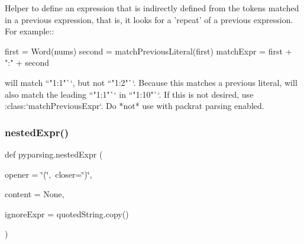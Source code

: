 \begin{DoxyVerb}Helper to define an expression that is indirectly defined from
the tokens matched in a previous expression, that is, it looks for
a 'repeat' of a previous expression.  For example::

    first = Word(nums)
    second = matchPreviousLiteral(first)
    matchExpr = first + ":" + second

will match ``"1:1"``, but not ``"1:2"``.  Because this
matches a previous literal, will also match the leading
``"1:1"`` in ``"1:10"``. If this is not desired, use
:class:`matchPreviousExpr`. Do *not* use with packrat parsing
enabled.
\end{DoxyVerb}
 \mbox{\label{namespacepyparsing_a9c52168a8f25a43675d7ee8d271332cb}} 
\subsubsection{\texorpdfstring{nested\+Expr()}{nestedExpr()}}
{\footnotesize\ttfamily def pyparsing.\+nested\+Expr (\begin{DoxyParamCaption}\item[{}]{opener = {\ttfamily \char`\"{}(\char`\"{},~closer=\char`\"{})\char`\"{}},  }\item[{}]{content = {\ttfamily None},  }\item[{}]{ignore\+Expr = {\ttfamily quotedString.copy()} }\end{DoxyParamCaption})}


